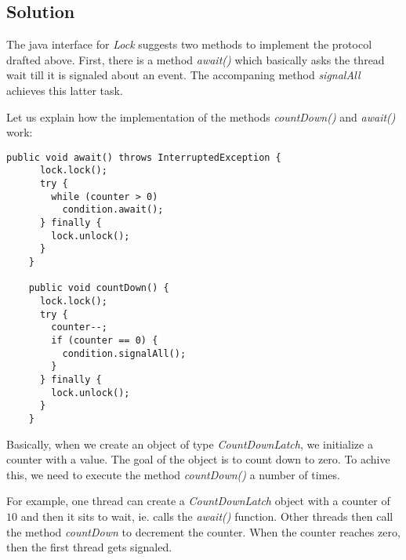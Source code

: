 \subsection{Solution}
\par
The java interface for \textit{Lock} suggests two methods to implement the
protocol drafted above. First, there is a method \textit{await()} which
basically asks the thread wait till it is signaled about an event. The
accompaning method \textit{signalAll} achieves this latter task.
\par
Let us explain how the implementation of the methods \textit{countDown()} and
\textit{await()} work:
\par
\hfill
\begin{lstlisting}[style=numbers]
    public void await() throws InterruptedException {
      lock.lock(); 
      try {
        while (counter > 0)
          condition.await();
      } finally {
        lock.unlock();
      }
    } 
      
    public void countDown() {
      lock.lock();
      try {
        counter--;
        if (counter == 0) {
          condition.signalAll();
        }
      } finally {
        lock.unlock();
      }
    }   
\end{lstlisting}
\hfill
\par
Basically, when we create an object of type \textit{CountDownLatch}, we
initialize a counter with a value. The goal of the object is to count down to
zero. To achive this, we need to execute the method \textit{countDown()} a
number of times. 
\par
For example, one thread can create a \textit{CountDownLatch} object with a
counter of $10$ and then it sits to wait, ie. calls the \textit{await()}
function. Other threads then call the method \textit{countDown} to decrement the
counter. When the counter reaches zero, then the first thread gets signaled.
\par
